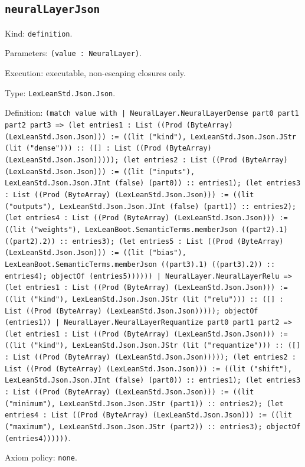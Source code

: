 \documentclass[11pt]{article}
\begin{document}
\subsection*{\texttt{neuralLayerJson}}
\noindent Kind: \texttt{definition}.\par
\noindent Parameters: \texttt{(value : NeuralLayer)}.\par
\noindent Execution: executable, non-escaping closures only.\par
\noindent Type: \texttt{LexLeanStd.Json.Json}.\par
\noindent Definition: \texttt{(match value with | NeuralLayer.NeuralLayerDense part0 part1 part2 part3 => (let entries1 : List ((Prod (ByteArray) (LexLeanStd.Json.Json))) := ((lit ("kind"), LexLeanStd.Json.Json.JStr (lit ("dense"))) :: ([] : List ((Prod (ByteArray) (LexLeanStd.Json.Json))))); (let entries2 : List ((Prod (ByteArray) (LexLeanStd.Json.Json))) := ((lit ("inputs"), LexLeanStd.Json.Json.JInt (false) (part0)) :: entries1); (let entries3 : List ((Prod (ByteArray) (LexLeanStd.Json.Json))) := ((lit ("outputs"), LexLeanStd.Json.Json.JInt (false) (part1)) :: entries2); (let entries4 : List ((Prod (ByteArray) (LexLeanStd.Json.Json))) := ((lit ("weights"), LexLeanBoot.SemanticTerms.memberJson ((part2).1) ((part2).2)) :: entries3); (let entries5 : List ((Prod (ByteArray) (LexLeanStd.Json.Json))) := ((lit ("bias"), LexLeanBoot.SemanticTerms.memberJson ((part3).1) ((part3).2)) :: entries4); objectOf (entries5)))))) | NeuralLayer.NeuralLayerRelu => (let entries1 : List ((Prod (ByteArray) (LexLeanStd.Json.Json))) := ((lit ("kind"), LexLeanStd.Json.Json.JStr (lit ("relu"))) :: ([] : List ((Prod (ByteArray) (LexLeanStd.Json.Json))))); objectOf (entries1)) | NeuralLayer.NeuralLayerRequantize part0 part1 part2 => (let entries1 : List ((Prod (ByteArray) (LexLeanStd.Json.Json))) := ((lit ("kind"), LexLeanStd.Json.Json.JStr (lit ("requantize"))) :: ([] : List ((Prod (ByteArray) (LexLeanStd.Json.Json))))); (let entries2 : List ((Prod (ByteArray) (LexLeanStd.Json.Json))) := ((lit ("shift"), LexLeanStd.Json.Json.JInt (false) (part0)) :: entries1); (let entries3 : List ((Prod (ByteArray) (LexLeanStd.Json.Json))) := ((lit ("minimum"), LexLeanStd.Json.Json.JStr (part1)) :: entries2); (let entries4 : List ((Prod (ByteArray) (LexLeanStd.Json.Json))) := ((lit ("maximum"), LexLeanStd.Json.Json.JStr (part2)) :: entries3); objectOf (entries4))))))}.\par
\noindent Axiom policy: \texttt{none}.\par
\end{document}
